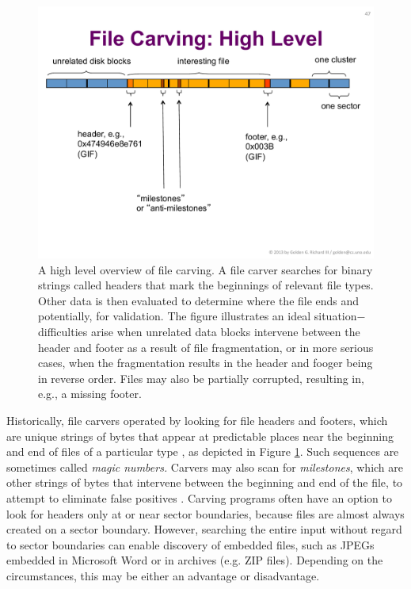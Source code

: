 \begin{figure}[ht]
\begin{center}
\includegraphics[width=140mm]{ch-carving/carvingoverview.pdf}
\end{center}
\caption{A high level overview of file carving.  A file carver
  searches for binary strings called headers that mark the beginnings
  of relevant file types.  Other data is then evaluated to determine
  where the file ends and potentially, for validation.  The figure
  illustrates an ideal situation$-$difficulties arise when unrelated
  data blocks intervene between the header and footer as a result of
  file fragmentation, or in more serious cases, when the fragmentation
  results in the header and fooger being in reverse order.  Files may
  also be partially corrupted, resulting in, e.g., a missing footer.}
\label{fig:carvingoverview}
\end{figure}

Historically, file carvers operated by looking for file headers and
footers, which are unique strings of bytes that appear at predictable
places near the beginning and end of files of a particular type
\cite{Foremost, Scalpel}, as depicted in Figure \ref{fig:carvingoverview}.
Such sequences are sometimes called
\emph{magic numbers.} Carvers may also scan for \emph{milestones}, which
are other strings of bytes that intervene between the beginning and
end of the file, to attempt to eliminate false positives 
\label{def:milestones}.  Carving programs often have an option to look for headers
only at or near sector boundaries, because files are almost always
created on a sector boundary.  However, searching the entire input
without regard to sector boundaries can enable discovery of embedded
files, such as JPEGs embedded in Microsoft Word or in archives
(e.g. ZIP files).  Depending on the circumstances, this may be either
an advantage or disadvantage. 

